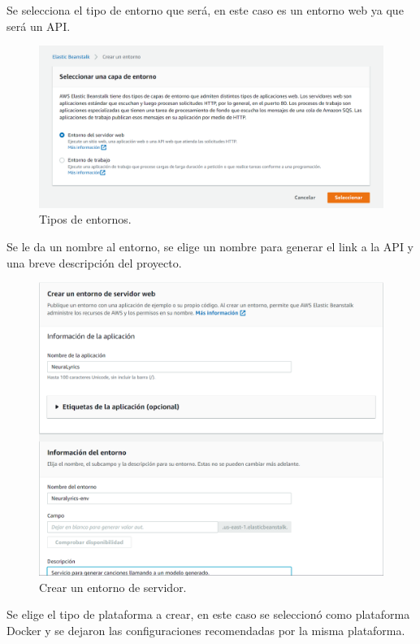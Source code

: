 \documentclass[12pt, a4paper, titlepage]{article}
\begin{document}
		Se selecciona el tipo de entorno que será, en este caso es un entorno web ya que será un API.
		\begin{figure}[H]
			\includegraphics[width=12cm]{./Imagenes/BackEnd/paso_1.png}
			\centering 
			\caption{Tipos de entornos.}
		\end{figure}
		Se le da un nombre al entorno, se elige un nombre para generar el link a la API y una breve descripción del proyecto.
		\begin{figure}[H]
			\includegraphics[width=12cm]{./Imagenes/BackEnd/paso_2.png}
			\centering 
			\caption{Crear un entorno de servidor.}
		\end{figure}
		Se elige el tipo de plataforma a crear, en este caso se seleccionó como plataforma Docker y se dejaron las configuraciones recomendadas por la misma plataforma.
\end{document}

